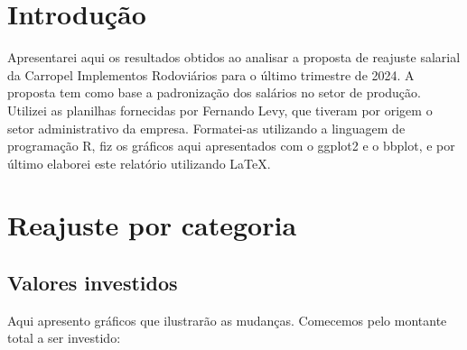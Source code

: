 \documentclass[a4paper, 12pt]{CSSullivanBusinessReport}
\begin{document}
\section{Introdução} 
\begin{fullwidth}
Apresentarei aqui os resultados obtidos ao analisar a proposta de reajuste salarial da Carropel Implementos Rodoviários para o último trimestre de 2024. A proposta tem como base a padronização dos salários no setor de produção. Utilizei as planilhas fornecidas por Fernando Levy, que tiveram por origem o setor administrativo da empresa. Formatei-as utilizando a linguagem de programação R, fiz os gráficos aqui apresentados com o ggplot2 e o bbplot, e por último elaborei este relatório utilizando \LaTeX.


\section{Reajuste por categoria} 


\subsection{Valores investidos}

Aqui apresento gráficos que ilustrarão as mudanças. Comecemos pelo montante total a ser investido:




\end{fullwidth}
\end{document}
